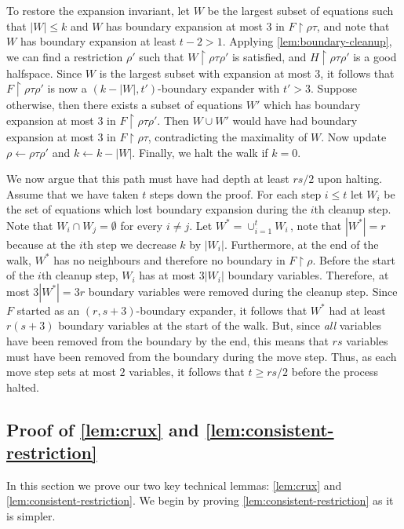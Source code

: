 	To restore the expansion invariant, let $W$ be the largest subset of equations such that $|W| \leq k$ and $W$ has boundary expansion at most $3$ in $F \restriction \rho\tau$, and note that $W$ has boundary expansion at least $t-2 > 1$.
	Applying \autoref{lem:boundary-cleanup}, we can find a restriction $\rho'$ such that $W \restriction \rho\tau\rho'$ is satisfied, and $H \restriction \rho\tau\rho'$ is a good halfspace.
	Since $W$ is the largest subset with expansion at most $3$, it follows that $F \restriction \rho \tau \rho'$ is now a $(k-|W|, t')$-boundary expander with $t' > 3$. Suppose otherwise, then there exists a subset of equations $W'$ which has boundary expansion at most $3$ in $F \restriction \rho \tau \rho'$. Then $W \cup W'$ would have had boundary expansion at most $3$ in $F \restriction \rho \tau$, contradicting the maximality of $W$. Now update $\rho \leftarrow \rho\tau\rho'$ and $k \leftarrow k - |W|$.
	 Finally, we halt the walk if $k = 0$.

	We now argue that this path must have had depth at least $rs /2$ upon halting.
	Assume that we have taken $t$ steps down the proof. 
	For each step $i \leq t$ let $W_i$ be the set of equations which lost boundary expansion during the $i$th cleanup step. 
	Note that $W_i \cap W_j = \emptyset$ for every $i \neq j$. 
	Let $W^* = \cup_{i=1}^t W_i\,$, note that $|W^*| = r$ because at the $i$th step we decrease $k$ by $|W_i|$. Furthermore, at the end of the walk, $W^*$ has no neighbours and therefore no boundary in $F\restriction \rho$. 
	Before the start of the $i$th cleanup step, $W_i$ has at most $3|W_i|$ boundary variables. 
	Therefore, at most $3|W^*| = 3r$ boundary variables were removed during the cleanup step. 
	Since $F$ started as an $(r, s+3)$-boundary expander, it follows that $W^*$ had at least $r(s+3)$ boundary variables at the start of the walk.
	But, since \emph{all} variables have been removed from the boundary by the end, this means that $rs$ variables must have been removed from the boundary during the move step.
	Thus, as each move step sets at most $2$ variables, it follows that $t \geq rs/2$ before the process halted. 



\subsection{Proof of \autoref{lem:crux} and \autoref{lem:consistent-restriction}}
In this section we prove our two key technical lemmas: \autoref{lem:crux} and \autoref{lem:consistent-restriction}.
We begin by proving \autoref{lem:consistent-restriction} as it is simpler.

